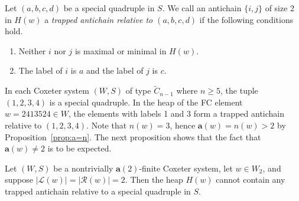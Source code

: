 \documentclass[ALCO,Unicode,published]{cedram}
\newcommand{\call}{\mathcal{L}}
\newcommand{\calr}{\mathcal{R}}
\newcommand{\la}{\mathbf{a}}
\newcommand{\ntatf}{nontrivially $\la(2)$-finite }
\newcommand{\abs}[1]{\lvert #1 \rvert}
\begin{document}
\begin{definition}
    Let $(a,b,c,d)$ be a special quadruple in $S$. We call an antichain $\{i,j\}$ of size 2 in $H(w)$ a
    \emph{trapped antichain relative to $(a,b,c,d)$} if the following conditions hold.
    \begin{enumerate}
        \item Neither $i$ nor $j$ is maximal or minimal in $H(w)$.
        \item The label of $i$ is $a$ and the label of $j$ is $c$. 
    \end{enumerate}
    \label{def:trapped}
\end{definition}


\begin{example}
    In each Coxeter system $(W,S)$ of type $\tilde C_{n-1}$ where $n\ge 5$, the tuple $(1,2,3,4)$ is
    a special quadruple.  In the heap of the FC element $w=2413524\in W$, the elements with labels 1
    and 3 form a trapped antichain relative to $(1,2,3,4)$. Note that $n(w)=3$, hence
    $\la(w)=n(w)>2$ by Proposition~\ref{prop:a=n}. The next proposition shows that the fact that $\la(w)\neq 2$
    is to be expected.
\end{example}

\begin{prop}
    Let $(W,S)$ be a \ntatf Coxeter system, let $w\in W_2$, and suppose
    $\abs{\call(w)}=\abs{\calr(w)}=2$. Then the heap $H(w)$ cannot contain any trapped antichain
    relative to a special quadruple in $S$.
    \label{prop:trapped}
\end{prop}
\end{document}
